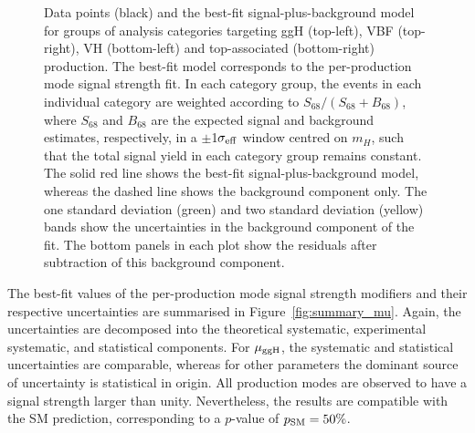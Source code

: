 \begin{figure}[htb!]
{    Data points (black) and the best-fit signal-plus-background model for groups of analysis categories targeting ggH (top-left), VBF (top-right), VH (bottom-left) and top-associated (bottom-right) production. The best-fit model corresponds to the per-production mode signal strength fit. In each category group, the events in each individual category are weighted according to $S_{68}/(S_{68}+B_{68})$, where $S_{68}$ and $B_{68}$ are the expected signal and background estimates, respectively, in a $\pm$1$\sigma_{\rm{eff}}$ window centred on $m_H$, such that the total signal yield in each category group remains constant. The solid red line shows the best-fit signal-plus-background model, whereas the dashed line shows the background component only. The one standard deviation (green) and two standard deviation (yellow) bands show the uncertainties in the background component of the fit. The bottom panels in each plot show the residuals after subtraction of this background component.
  }
  \label{fig:sb_mu}
\end{figure}

The best-fit values of the per-production mode signal strength modifiers and their respective uncertainties are summarised in Figure~\ref{fig:summary_mu}. Again, the uncertainties are decomposed into the theoretical systematic, experimental systematic, and statistical components. For $\mu_{\rm{ggH}}$, the systematic and statistical uncertainties are comparable, whereas for other parameters the dominant source of uncertainty is statistical in origin. All production modes are observed to have a signal strength larger than unity. Nevertheless, the results are compatible with the SM prediction, corresponding to a $p$-value of $p_{\rm{SM}}=50\%$.


